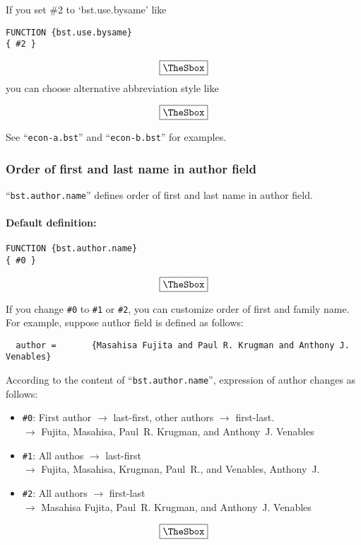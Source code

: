 \documentclass[10pt]{article}
\newenvironment{Frame}%
{\setlength{\fboxsep}{15pt}
\setlength{\mylength}{\linewidth}%
\addtolength{\mylength}{-2\fboxsep}%
\addtolength{\mylength}{-2\fboxrule}%
\Sbox
\minipage{\mylength}%
\setlength{\abovedisplayskip}{0pt}%
\setlength{\belowdisplayskip}{0pt}%
}%
{\endminipage\endSbox
\[\fbox{\TheSbox}\]}
\newcommand{\bysameline}{\hskip.3em \leavevmode\rule[.5ex]{3em}{.3pt}\hskip0.5em}
\begin{document}
If you set \#2 to `bst.use.bysame' like
\begin{Frame}
\begin{verbatim}
FUNCTION {bst.use.bysame}
{ #2 }  
\end{verbatim}
\end{Frame}
you can choose alternative abbreviation style like
\begin{Frame}
\end{Frame}
\vspace*{1em}

See ``\texttt{econ-a.bst}'' and ``\texttt{econ-b.bst}'' for examples.


\subsubsection{Order of first and last name in author field}

``\texttt{bst.author.name}'' defines order of first and last name in author field.

\paragraph{Default definition:}
\begin{Frame}
\begin{verbatim}
FUNCTION {bst.author.name}
{ #0 }
\end{verbatim}
\end{Frame}

If you change \verb|#0| to \verb|#1| or \verb|#2|, you can customize
order of first and family name.  For example, suppose author field is
defined as follows:
\begin{verbatim}
  author =       {Masahisa Fujita and Paul R. Krugman and Anthony J. Venables}
\end{verbatim}

According to the content of ``\texttt{bst.author.name}'', expression of
author changes as follows:
\begin{Frame}
\begin{itemize}
 \item \verb|#0|: First author $\rightarrow$ last-first, other authors
       $\rightarrow$ first-last.\\
       $\rightarrow$ Fujita, Masahisa, Paul~R. Krugman, and
       Anthony~J. Venables
 \item \verb|#1|: All authos $\rightarrow$ last-first \\
       $\rightarrow$ Fujita, Masahisa, Krugman, Paul~R., and Venables, Anthony~J.
 \item \verb|#2|: All authors $\rightarrow$ first-last \\
       $\rightarrow$ Masahisa Fujita, Paul~R. Krugman, and Anthony~J. Venables
\end{itemize}
\end{Frame}
\end{document}
